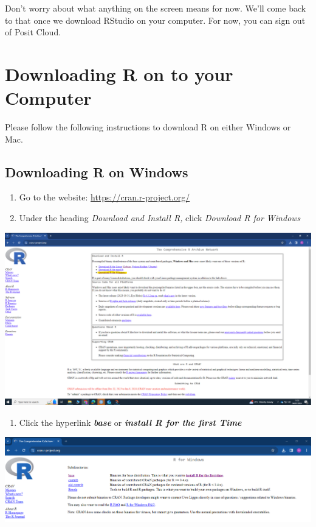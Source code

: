 \documentclass[
]{book}
\providecommand{\tightlist}{%
  \setlength{\itemsep}{0pt}\setlength{\parskip}{0pt}}
\begin{document}
Don't worry about what anything on the screen means for now. We'll come back to that once we download RStudio on your computer. For now, you can sign out of Posit Cloud.

\hypertarget{downloading-r-on-to-your-computer}{%
\section{Downloading R on to your Computer}\label{downloading-r-on-to-your-computer}}

Please follow the following instructions to download R on either Windows or Mac.

\hypertarget{downloading-r-on-windows}{%
\subsection{Downloading R on Windows}\label{downloading-r-on-windows}}

\begin{enumerate}
\def\labelenumi{\arabic{enumi}.}
\tightlist
\item
  Go to the website: \url{https://cran.r-project.org/}
\item
  Under the heading \emph{Download and Install R,} click \emph{Download R for Windows}
\end{enumerate}

\includegraphics{img/01-cran.png}

\begin{enumerate}
\def\labelenumi{\arabic{enumi}.}
\setcounter{enumi}{2}
\tightlist
\item
  Click the hyperlink \textbf{\emph{base}} or \textbf{\emph{install R for the first Time}}
\end{enumerate}

\includegraphics{img/01-base.png}
\end{document}
